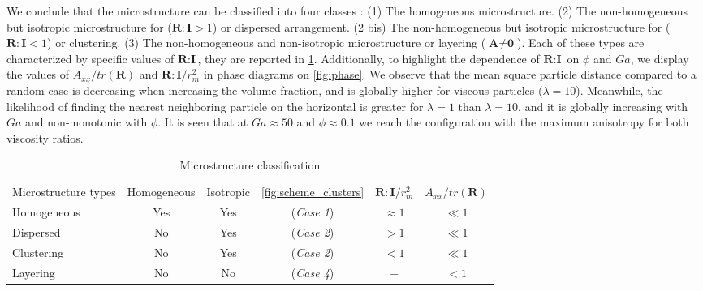 We conclude that the microstructure can be classified into four classes :
(1) The homogeneous microstructure.
(2) The non-homogeneous but isotropic microstructure for ($\textbf{R}:\textbf{I} > 1$) or dispersed arrangement. %
(2 bis) The non-homogeneous but isotropic microstructure for ($\textbf{R}:\textbf{I} < 1$) or clustering. 
(3) The non-homogeneous and non-isotropic microstructure or layering ($\textbf{A}\neq \textbf{0}$). 
Each of these types are characterized by specific values of $\textbf{R}:\textbf{I}$, they are reported in \ref{tab:microstructure}. 
Additionally, to highlight the dependence of $\textbf{R}:\textbf{I}$ on $\phi$ and $Ga$, we display the values of $A_{xx}/tr(\textbf{R})$ and $\textbf{R}:\textbf{I}/r_m^2$ in phase diagrams on \ref{fig:phase}.
We observe that the mean square particle distance compared to a random case is decreasing when increasing the volume fraction, and is globally higher for viscous particles ($\lambda = 10$).
Meanwhile, the likelihood of finding the nearest neighboring particle on the horizontal is greater for $\lambda=1$ than $\lambda = 10$, and it is globally increasing with  $Ga$ and non-monotonic with $\phi$. 
It is seen that at $Ga \approx 50$ and $\phi \approx 0.1$ we reach the configuration with the maximum anisotropy for both viscosity ratios. 
\begin{table}[h!]
    \caption{Microstructure classification}
    \label{tab:microstructure}
    \centering
    \begin{tabular}{|lccccc|} \hline
        Microstructure types & Homogeneous & Isotropic & \ref{fig:scheme_clusters} & $\textbf{R}:\textbf{I}/r_m^2$ & $A_{xx}/tr(\textbf{R})$ \\
        Homogeneous & Yes & Yes &(\textit{Case 1}) & $ \approx 1$ & $\ll 1$ \\
        Dispersed &  No & Yes  &(\textit{Case 2}) & $ > 1$ & $\ll 1$ \\
        Clustering &  No & Yes  &(\textit{Case 2}) & $ < 1$ & $\ll 1$ \\
        Layering &    No & No  &(\textit{Case 4}) & $ - $ & $< 1$\\ \hline
    \end{tabular}
\end{table}
